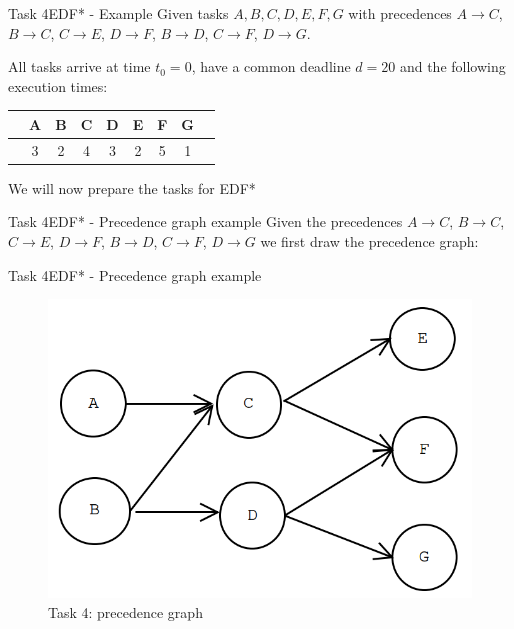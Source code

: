 \begin{frame}[allowframebreaks]{Task 4}{EDF* - Example}
Given tasks $A, B, C, D, E, F, G$ with precedences $A \rightarrow C$, $B \rightarrow C$, $C \rightarrow E$, $D \rightarrow F$, $B \rightarrow D$, $C \rightarrow F$, $D \rightarrow G$.

All tasks arrive at time $t_0 = 0$, have a common deadline $d = 20$ and the following execution times:
\begin{center}
\begin{tabular}{|c|c|c|c|c|c|c|c|c|}
     \hline
     & A & B & C & D & E & F & G\\
     \hline
     \hline
     & 3 & 2 & 4 & 3 & 2 & 5 & 1\\
     \hline
\end{tabular}
\end{center}
We will now prepare the tasks for EDF*
\end{frame}

\begin{frame}{Task 4}{EDF* - Precedence graph example}
Given the precedences $A \rightarrow C$, $B \rightarrow C$, $C \rightarrow E$, $D \rightarrow F$, $B \rightarrow D$, $C \rightarrow F$, $D \rightarrow G$ we first draw the precedence graph:
\end{frame}

\begin{frame}{Task 4}{EDF* - Precedence graph example}
\begin{figure}
    \centering
    \includegraphics[scale=0.4]{figures/precedencegraph}
    \caption{Task 4: precedence graph}
    \label{pregraph}
\end{figure}
\end{frame}

